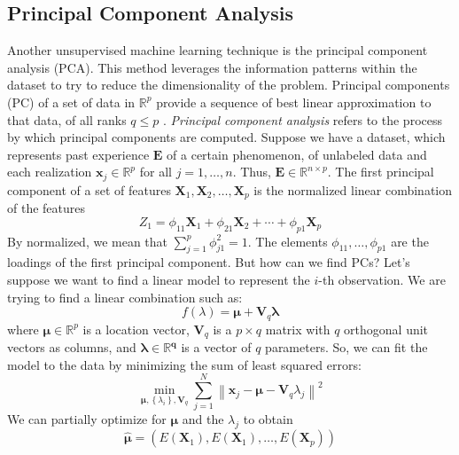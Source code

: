 \subsection{Principal Component Analysis}
\label{subsec:PCA}
Another unsupervised machine learning technique is the principal component analysis (PCA). This method leverages the information patterns within the dataset to try to reduce the dimensionality of the problem. Principal components (PC) of a set of data in $\mathbb{R}^p$ provide a sequence of best linear approximation to that data, of all ranks $q\le p$ \cite{james_introduction_2021, tibshirani_elements_2008}. \emph{Principal component analysis} refers to the process by which principal components are computed. Suppose we have a dataset, which represents past experience $\mathbf{E}$ of a certain phenomenon, of unlabeled data and each realization $\mathbf{x}_j \in \mathbb{R}^p$ for all $j=1,\dots,n$. Thus, $\mathbf{E} \in \mathbb{R}^{n\times p}$. The first principal component of a set of features $\mathbf{X}_1, \mathbf{X}_2, \dots, \mathbf{X}_p$ is the normalized linear combination of the features
\begin{equation}
    \label{eq:firstPC}
    Z_1=\phi_{11} \mathbf{X}_1+\phi_{21} \mathbf{X}_2+\cdots+\phi_{p1} \mathbf{X}_p
\end{equation}
By normalized, we mean that $\sum_{j=1}^p\phi_{j1}^2=1$. The elements $\phi_{11},\dots,\phi_{p1}$ are the loadings of the first principal component. But how can we find PCs? Let's suppose we want to find a linear model to represent the $i$-th observation. We are trying to find a linear combination such as:
\begin{equation}
    \label{eq:pcaf}
    f(\lambda)=\bm{\mu}+\mathbf{V}_q\bm{\lambda}
\end{equation}
where $\bm{\mu}\in \mathbb{R}^p$ is a location vector, $\mathbf{V}_q$ is a $p\times q$ matrix with $q$ orthogonal unit vectors as columns, and $\bm{\lambda \in \mathbb{R}^q}$ is a vector of $q$ parameters. So, we can fit the model to the data by minimizing the sum of least squared errors:
\begin{equation}
    \label{eq:SSE}
    \min _{\bm{\mu},\left\{\lambda_i\right\}, \mathbf{V}_q} \sum_{j=1}^N\left\|\mathbf{x}_j-\bm{\mu}-\mathbf{V}_q \lambda_j\right\|^2
\end{equation}
We can partially optimize for $\bm{\mu}$ and the $\lambda_j$ to obtain
\begin{equation}
    \hat{\bm{\mu}} = \left(E\left(\mathbf{X}_1\right), E\left(\mathbf{X}_1\right), \dots, E\left(\mathbf{X}_p\right)\right)
\end{equation}
